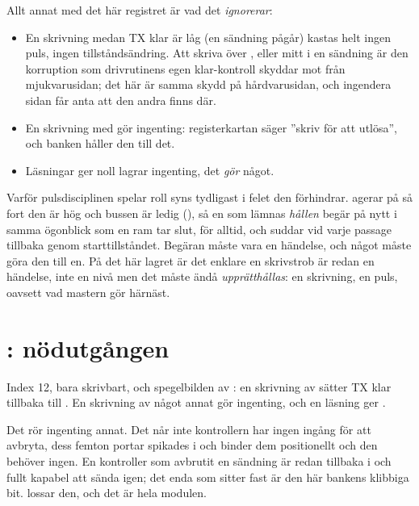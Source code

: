 Allt annat med det här registret är vad det \emph{ignorerar}:
\begin{itemize}
  \item En skrivning medan TX klar är låg (en sändning pågår) kastas helt \textemdash{} ingen puls,
    ingen tillståndsändring. Att skriva över ,  eller  mitt i
    en sändning är den korruption som drivrutinens egen klar-kontroll skyddar mot från
    mjukvarusidan; det här är samma skydd på hårdvarusidan, och ingendera sidan får anta att den
    andra finns där.
  \item En skrivning med  gör ingenting: registerkartan säger ”skriv
     för att utlösa”, och banken håller den till det.
  \item Läsningar ger noll \textemdash{}  lagrar ingenting, det \emph{gör} något.
\end{itemize}

Varför pulsdisciplinen spelar roll syns tydligast i felet den förhindrar.  agerar
på  så fort den är hög och bussen är ledig (), så en  som
lämnas \emph{hållen} begär på nytt i samma ögonblick som en ram tar slut, för alltid, och suddar
 vid varje passage tillbaka genom starttillståndet. Begäran måste vara en händelse, och
något måste göra den till en. På det här lagret är det enklare \textemdash{} en skrivstrob är redan
en händelse, inte en nivå \textemdash{} men det måste ändå \emph{upprätthållas}: en skrivning, en
puls, oavsett vad mastern gör härnäst.

\section{: nödutgången}
\label{c18:sec:txabort}

Index 12, bara skrivbart, och spegelbilden av : en skrivning av  sätter TX
klar tillbaka till . En skrivning av något annat gör ingenting, och en läsning ger
.

Det rör ingenting annat. Det når inte  \textemdash{} kontrollern har ingen
ingång för att avbryta, dess femton portar spikades i  och 
binder dem positionellt \textemdash{} och den behöver ingen. En kontroller som avbrutit en sändning
är redan tillbaka i  och fullt kapabel att sända igen; det enda som sitter fast är
den här bankens klibbiga bit.  lossar den, och det är hela modulen.

